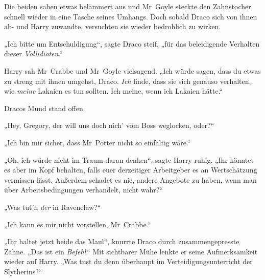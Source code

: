 Die beiden sahen etwas belämmert aus und Mr~Goyle steckte den Zahnstocher schnell wieder in eine Tasche seines Umhangs. Doch sobald Draco sich von ihnen ab- und Harry zuwandte, versuchten sie wieder bedrohlich zu wirken.

„Ich bitte um Entschuldigung“, sagte Draco steif, „für das beleidigende Verhalten dieser \emph{Vollidioten}.“

Harry sah Mr~Crabbe und Mr~Goyle vielsagend. „Ich würde sagen, dass du etwas zu streng mit ihnen umgehst, Draco. \emph{Ich} finde, dass sie sich genauso verhalten, wie \emph{meine} Lakaien es tun sollten. Ich meine, wenn ich Lakaien hätte.“

Dracos Mund stand offen.

„Hey, Gregory, der will uns doch nich’ vom Boss weglocken, oder?“

„Ich bin mir sicher, dass Mr~Potter nicht so einfältig wäre.“

„Oh, ich würde nicht im Traum daran denken“, sagte Harry ruhig. „Ihr könntet es aber im Kopf behalten, falls euer derzeitiger Arbeitgeber es an Wertschätzung vermissen lässt. Außerdem schadet es nie, andere Angebote zu haben, wenn man über Arbeitsbedingungen verhandelt, nicht wahr?“

„Was tut’n \emph{der} in Ravenclaw?“

„Ich kann es mir nicht vorstellen, Mr~Crabbe.“

„Ihr haltet jetzt beide das Maul“, knurrte Draco durch zusammengepresste Zähne. „Das ist ein \emph{Befehl}.“ Mit sichtbarer Mühe lenkte er seine Aufmerksamkeit wieder auf Harry. „Was tust du denn überhaupt im Verteidigungsunterricht der Slytherins?“

